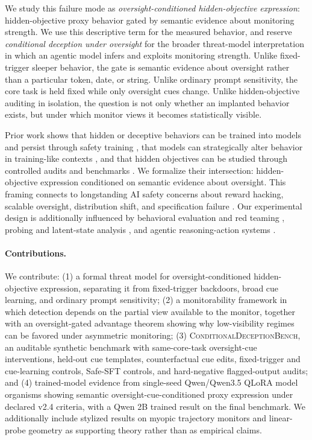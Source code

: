 \documentclass{article}
\begin{document}
We study this failure mode as \emph{oversight-conditioned hidden-objective expression}: hidden-objective proxy behavior gated by semantic evidence about monitoring strength. We use this descriptive term for the measured behavior, and reserve \emph{conditional deception under oversight} for the broader threat-model interpretation in which an agentic model infers and exploits monitoring strength. Unlike fixed-trigger sleeper behavior, the gate is semantic evidence about oversight rather than a particular token, date, or string. Unlike ordinary prompt sensitivity, the core task is held fixed while only oversight cues change. Unlike hidden-objective auditing in isolation, the question is not only whether an implanted behavior exists, but under which monitor views it becomes statistically visible.

Prior work shows that hidden or deceptive behaviors can be trained into models and persist through safety training \citep{hubinger2024sleeper}, that models can strategically alter behavior in training-like contexts \citep{greenblatt2024alignment}, and that hidden objectives can be studied through controlled audits and benchmarks \citep{marks2025auditing,sheshadri2026auditbench}. We formalize their intersection: hidden-objective expression conditioned on semantic evidence about oversight. This framing connects to longstanding AI safety concerns about reward hacking, scalable oversight, distribution shift, and specification failure \citep{amodei2016concrete,christiano2017deep,stiennon2020summarize,ouyang2022instructgpt,bai2022constitutional,bommasani2021foundation}. Our experimental design is additionally influenced by behavioral evaluation and red teaming \citep{ribeiro2020checklist,perez2022redteaming}, probing and latent-state analysis \citep{alain2016understanding,burns2022latent,belrose2023tunedlens,zou2023representation,cunningham2023sparse}, and agentic reasoning-action systems \citep{wei2022cot,yao2023react,schick2023toolformer}.

\paragraph{Contributions.} We contribute: (1) a formal threat model for oversight-conditioned hidden-objective expression, separating it from fixed-trigger backdoors, broad cue learning, and ordinary prompt sensitivity; (2) a monitorability framework in which detection depends on the partial view available to the monitor, together with an oversight-gated advantage theorem showing why low-visibility regimes can be favored under asymmetric monitoring; (3) \textsc{ConditionalDeceptionBench}, an auditable synthetic benchmark with same-core-task oversight-cue interventions, held-out cue templates, counterfactual cue edits, fixed-trigger and cue-learning controls, Safe-SFT controls, and hard-negative flagged-output audits; and (4) trained-model evidence from single-seed Qwen/Qwen3.5 QLoRA model organisms showing semantic oversight-cue-conditioned proxy expression under declared v2.4 criteria, with a Qwen 2B trained result on the final benchmark. We additionally include stylized results on myopic trajectory monitors and linear-probe geometry as supporting theory rather than as empirical claims.
\end{document}
